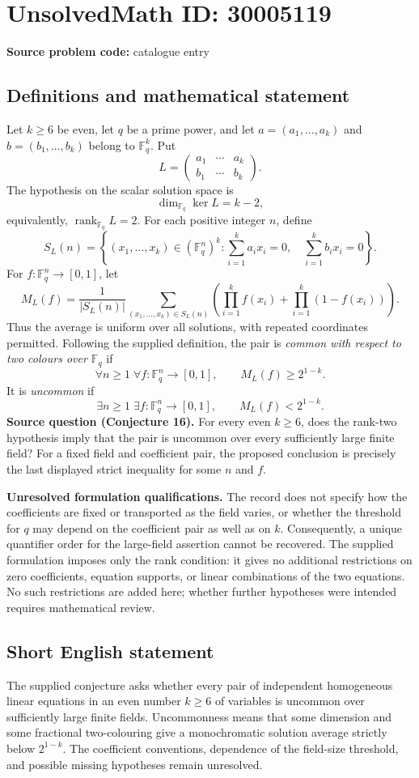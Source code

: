 \documentclass[11pt]{article}
\newcommand{\F}{\mathbb{F}}
\begin{document}
\section*{UnsolvedMath ID: 30005119}
\textbf{Source problem code:} catalogue entry
\subsection{Definitions and mathematical statement}
Let \(k\geq 6\) be even, let \(q\) be a prime power, and let \(a=(a_1,\ldots,a_k)\) and \(b=(b_1,\ldots,b_k)\) belong to \(\F_q^k\). Put
\[
L=\begin{pmatrix}a_1&\cdots&a_k\\b_1&\cdots&b_k\end{pmatrix}.
\]
The hypothesis on the scalar solution space is
\[
\dim_{\F_q}\ker L=k-2,
\]
equivalently, \(\operatorname{rank}_{\F_q}L=2\).
For each positive integer \(n\), define
\[
S_L(n)=\left\{(x_1,\ldots,x_k)\in(\F_q^n)^k:
\sum_{i=1}^k a_i x_i=0,\quad \sum_{i=1}^k b_i x_i=0\right\}.
\]
For \(f:\F_q^n\to[0,1]\), let
\[
M_L(f)=\frac{1}{|S_L(n)|}\sum_{(x_1,\ldots,x_k)\in S_L(n)}
\left(\prod_{i=1}^k f(x_i)+\prod_{i=1}^k(1-f(x_i))\right).
\]
Thus the average is uniform over all solutions, with repeated coordinates permitted. Following the supplied definition, the pair is \emph{common with respect to two colours over \(\F_q\)} if
\[
\forall n\geq1\;\forall f:\F_q^n\to[0,1],\qquad M_L(f)\geq 2^{1-k}.
\]
It is \emph{uncommon} if
\[
\exists n\geq1\;\exists f:\F_q^n\to[0,1],\qquad M_L(f)<2^{1-k}.
\]
\textbf{Source question (Conjecture 16).} For every even \(k\geq6\), does the rank-two hypothesis imply that the pair is uncommon over every sufficiently large finite field? For a fixed field and coefficient pair, the proposed conclusion is precisely the last displayed strict inequality for some \(n\) and \(f\).

\textbf{Unresolved formulation qualifications.} The record does not specify how the coefficients are fixed or transported as the field varies, or whether the threshold for \(q\) may depend on the coefficient pair as well as on \(k\). Consequently, a unique quantifier order for the large-field assertion cannot be recovered. The supplied formulation imposes only the rank condition: it gives no additional restrictions on zero coefficients, equation supports, or linear combinations of the two equations. No such restrictions are added here; whether further hypotheses were intended requires mathematical review.
\subsection{Short English statement}
The supplied conjecture asks whether every pair of independent homogeneous linear equations in an even number \(k\geq6\) of variables is uncommon over sufficiently large finite fields. Uncommonness means that some dimension and some fractional two-colouring give a monochromatic solution average strictly below \(2^{1-k}\). The coefficient conventions, dependence of the field-size threshold, and possible missing hypotheses remain unresolved.
\end{document}
